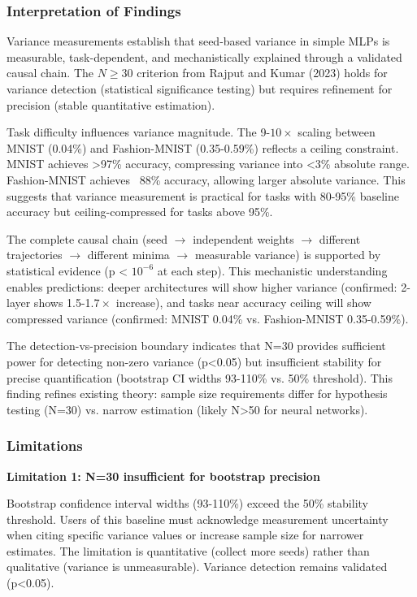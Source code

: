 
\subsubsection{Interpretation of Findings}

Variance measurements establish that seed-based variance in simple MLPs is measurable, task-dependent, and mechanistically explained through a validated causal chain. The $N\geq 30$ criterion from Rajput and Kumar (2023) holds for variance detection (statistical significance testing) but requires refinement for precision (stable quantitative estimation).

Task difficulty influences variance magnitude. The 9-$10\times$ scaling between MNIST (0.04\%) and Fashion-MNIST (0.35-0.59\%) reflects a ceiling constraint. MNIST achieves >97\% accuracy, compressing variance into <3\% absolute range. Fashion-MNIST achieves ~88\% accuracy, allowing larger absolute variance. This suggests that variance measurement is practical for tasks with 80-95\% baseline accuracy but ceiling-compressed for tasks above 95\%.

The complete causal chain (seed $\rightarrow$ independent weights $\rightarrow$ different trajectories $\rightarrow$ different minima $\rightarrow$ measurable variance) is supported by statistical evidence (p < $10^{-6}$ at each step). This mechanistic understanding enables predictions: deeper architectures will show higher variance (confirmed: 2-layer shows 1.5-1.$7\times$ increase), and tasks near accuracy ceiling will show compressed variance (confirmed: MNIST 0.04\% vs. Fashion-MNIST 0.35-0.59\%).

The detection-vs-precision boundary indicates that N=30 provides sufficient power for detecting non-zero variance (p<0.05) but insufficient stability for precise quantification (bootstrap CI widths 93-110\% vs. 50\% threshold). This finding refines existing theory: sample size requirements differ for hypothesis testing (N=30) vs. narrow estimation (likely N>50 for neural networks).

\subsubsection{Limitations}

\textbf{Limitation 1: N=30 insufficient for bootstrap precision}

Bootstrap confidence interval widths (93-110\%) exceed the 50\% stability threshold. Users of this baseline must acknowledge measurement uncertainty when citing specific variance values or increase sample size for narrower estimates. The limitation is quantitative (collect more seeds) rather than qualitative (variance is unmeasurable). Variance detection remains validated (p<0.05).

